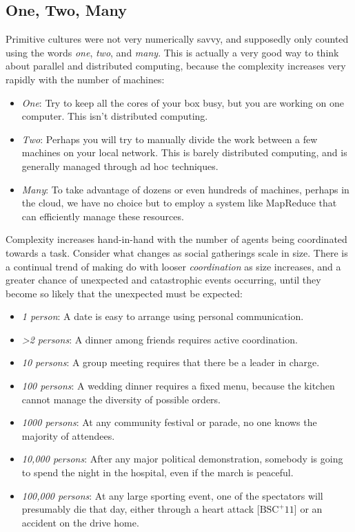 \documentclass[10pt]{article}
\begin{document}
\begin{enumerate}
\subsection*{One, Two, Many}
Primitive cultures were not very numerically savvy, and supposedly only counted using the words \textit{one}, \textit{two}, and \textit{many}. This is actually a very good way to think about parallel and distributed computing, because the complexity increases very rapidly with the number of machines:

\begin{itemize}
  \item \textit{One}: Try to keep all the cores of your box busy, but you are working on one computer. This isn't distributed computing.
  \item \textit{Two}: Perhaps you will try to manually divide the work between a few machines on your local network. This is barely distributed computing, and is generally managed through ad hoc techniques.
  \item \textit{Many}: To take advantage of dozens or even hundreds of machines, perhaps in the cloud, we have no choice but to employ a system like MapReduce that can efficiently manage these resources.
\end{itemize}

Complexity increases hand-in-hand with the number of agents being coordinated towards a task. Consider what changes as social gatherings scale in size. There is a continual trend of making do with looser \textit{coordination} as size increases, and a greater chance of unexpected and catastrophic events occurring, until they become so likely that the unexpected must be expected:

\begin{itemize}
  \item \textit{1 person}: A date is easy to arrange using personal communication.
  \item \textit{>2 persons}: A dinner among friends requires active coordination.
  \item \textit{10 persons}: A group meeting requires that there be a leader in charge.
  \item \textit{100 persons}: A wedding dinner requires a fixed menu, because the kitchen cannot manage the diversity of possible orders.
  \item \textit{1000 persons}: At any community festival or parade, no one knows the majority of attendees.
  \item \textit{10,000 persons}: After any major political demonstration, somebody is going to spend the night in the hospital, even if the march is peaceful.
  \item \textit{100,000 persons}: At any large sporting event, one of the spectators will presumably die that day, either through a heart attack [$\mathrm{BSC}^{+} 11$] or an accident on the drive home.
\end{itemize}


\end{enumerate}
\end{document}
